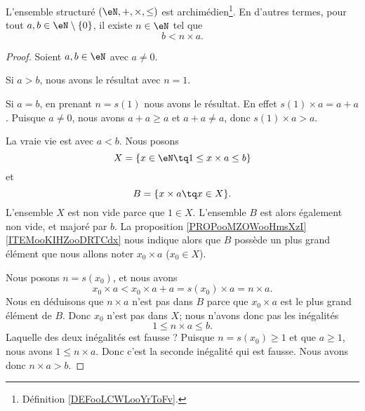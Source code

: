 \begin{proposition}     \label{PROPooCCVNooYUYcqG}
	L'ensemble structuré \( (\eN,+,\times, \leq)\) est archimédien\footnote{Définition \ref{DEFooLCWLooYrToFv}.}. En d'autres termes, pour tout \( a,b\in \eN\setminus\{ 0 \}\), il existe \( n\in \eN\) tel que
	\begin{equation}
		b<n\times a.
	\end{equation}
\end{proposition}

\begin{proof}
	Soient \( a,b\in \eN\) avec \( a\neq 0\).

	Si \( a>b\), nous avons le résultat avec \( n=1\).

	Si \( a=b\), en prenant \( n=s(1)\) nous avons le résultat. En effet \( s(1)\times a=a+a\). Puisque \( a\neq 0\), nous avons \( a+a\geq a\) et \( a+a\neq a\), donc \( s(1)\times a>a\).

	La vraie vie est avec \( a<b\). Nous posons
	\begin{equation}
		X=\{ x\in \eN\tq 1\leq x\times a\leq b \}
	\end{equation}
	et
	\begin{equation}
		B=\{ x\times a\tq x\in X \}.
	\end{equation}
	L'ensemble \( X\) est non vide parce que \( 1\in X\). L'ensemble \( B\) est alors également non vide, et majoré par \( b\). La proposition \ref{PROPooMZOWooHmsXzI}\ref{ITEMooKIHZooDRTCdx} nous indique alors que \( B\) possède un plus grand élément que nous allons noter \( x_0\times a\) (\( x_0\in X\)).

	Nous posons \( n=s(x_0)\), et nous avons
	\begin{equation}
		x_0\times a< x_0\times a +a=s(x_0)\times a=n\times a.
	\end{equation}
	Nous en déduisons que \( n\times a\) n'est pas dans \( B\) parce que \( x_0\times a\) est le plus grand élément de \( B\). Donc \( x_0\) n'est pas dans \( X\); nous n'avons donc pas les inégalités
	\begin{equation}
		1\leq n\times a\leq b.
	\end{equation}
	Laquelle des deux inégalités est fausse ? Puisque \( n=s(x_0)\geq 1\) et que \( a\geq 1\), nous avons \( 1\leq n\times a\). Donc c'est la seconde inégalité qui est fausse. Nous avons donc \( n\times a>b\).
\end{proof}

